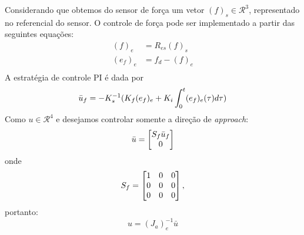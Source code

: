 Considerando que obtemos do sensor de força um vetor $({f})_s \in \mathcal{R}^3$, representado no referencial do sensor. O controle de força pode ser implementado a partir das seguintes equações:
\begin{align}
({f})_e &= {R}_{es} ({f})_s \\
({e}_f)_e &= {f}_d - ({f})_e \\
\end{align}
A estratégia de controle PI é dada por
\begin{equation}
\bar{{u}}_f = -{K}_s^{-1} ({K}_f ({e}_f)_e + {K}_i \int_0^t ({e}_f)_e (\tau)d\tau)\\
\end{equation}
Como ${u} \in \mathcal{R}^4$  e desejamos controlar somente a direção de \textit{approach}:
\begin{equation}
\bar{{u}} = \begin{bmatrix} {S}_f \bar{{u}}_f \\ 0\end{bmatrix} 
\end{equation}
onde 
\begin{equation}
{S}_f = \begin{bmatrix}
  1 & 0 & 0 \\
  0 & 0 & 0 \\
  0 & 0 & 0
\end{bmatrix},
\end{equation}
portanto:
\begin{equation}
{u} = ({J_a})_e^{-1} \bar{{u}}
\end{equation}



